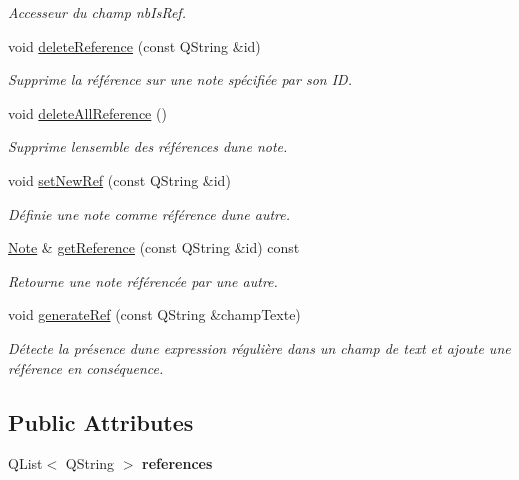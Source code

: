 \begin{DoxyCompactItemize}
\begin{DoxyCompactList}\small\item\em Accesseur du champ nb\+Is\+Ref. \end{DoxyCompactList}\item 
void \hyperlink{class_note_a91c86cf6ed18e4badb59a41e737a15fa}{delete\+Reference} (const Q\+String \&id)
\begin{DoxyCompactList}\small\item\em Supprime la référence sur une note spécifiée par son ID. \end{DoxyCompactList}\item 
void \hyperlink{class_note_aacbb89b120107a4b25dd16043908c693}{delete\+All\+Reference} ()
\begin{DoxyCompactList}\small\item\em Supprime l\textquotesingle{}ensemble des références d\textquotesingle{}une note. \end{DoxyCompactList}\item 
void \hyperlink{class_note_a3af2edc369310b9f122bd1fd6dbfa717}{set\+New\+Ref} (const Q\+String \&id)
\begin{DoxyCompactList}\small\item\em Définie une note comme référence d\textquotesingle{}une autre. \end{DoxyCompactList}\item 
\hyperlink{class_note}{Note} \& \hyperlink{class_note_a8e3ba6961f62a38f49b5fd209c083896}{get\+Reference} (const Q\+String \&id) const
\begin{DoxyCompactList}\small\item\em Retourne une note référencée par une autre. \end{DoxyCompactList}\item 
void \hyperlink{class_note_a5a0cb370ddd5a3da10fe8aa8a256d661}{generate\+Ref} (const Q\+String \&champ\+Texte)
\begin{DoxyCompactList}\small\item\em Détecte la présence d\textquotesingle{}une expression régulière dans un champ de text et ajoute une référence en conséquence. \end{DoxyCompactList}\end{DoxyCompactItemize}
\subsection*{Public Attributes}
\begin{DoxyCompactItemize}
\item 
\mbox{\label{class_note_ad8918cd74c86c9e00d72cb1a6a5a0f88}} 
Q\+List$<$ Q\+String $>$ {\bfseries references}
\end{DoxyCompactItemize}


